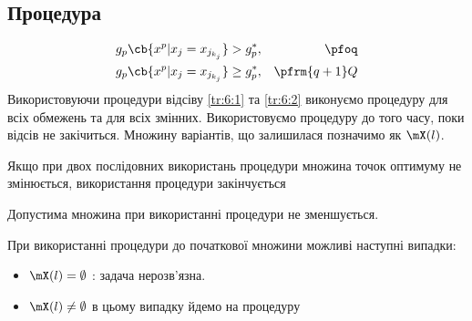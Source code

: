 \subsection{Процедура }
\begin{eqnarray}
&g_p\cb{x^p|x_j=x_{j_{k_j}}} > g_p^\ast,&\pfoq\label{tr:6:1}\\
&g_p\cb{x^p|x_j=x_{j_{k_j}}}  \geq g_p^\ast,& \pfrm{q+1}Q\label{tr:6:2}
\end{eqnarray}
Використовуючи процедури відсіву \eqref{tr:6:1} та \eqref{tr:6:2} виконуємо процедуру  для всіх обмежень та для всіх змінних. Використовуємо процедуру  до того часу, поки відсів не закічиться. Множину варіантів, що залишилася позначимо як $\mX(l)$.
\begin{tver}
Якщо при двох послідовних використань процедури  множина точок оптимуму не змінюється, використання процедури  закінчується
\end{tver}
\begin{tver}
Допустима множина при використанні процедури  не зменшується.
\end{tver}
При використанні процедури  до початкової множини можливі наступні випадки:
\begin{itemize}
\item $\mX(l)=\emptyset$ : задача нерозв’язна.
\item $\mX(l)\neq\emptyset$ в цьому випадку йдемо на процедуру 
\end{itemize}
